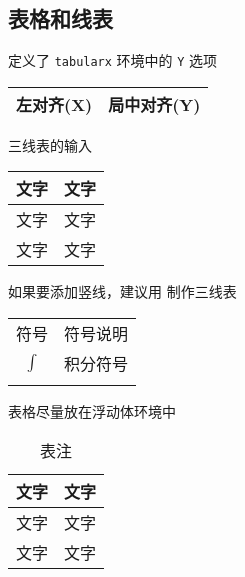 \documentclass{JXUSTmodeling}
\begin{document}
\subsection{表格和线表}
定义了 \texttt{tabularx} 环境中的 \texttt{Y} 选项
\begin{hexample}
\begin{tabularx}{\textwidth}{XY}
  \hline
  左对齐(X) & 局中对齐(Y)\\
  \hline
\end{tabularx}
\end{hexample}

三线表的输入
\begin{hexample}
\begin{tabularx}{\textwidth}{YY}
  \toprule
  文字 & 文字\\
  \midrule
  文字 & 文字\\
  文字 & 文字\\
  \bottomrule
\end{tabularx}
\end{hexample}
如果要添加竖线，建议用 \texttt{} 制作三线表
\begin{hexample}
\begin{tabularx}{\textwidth}{c@{\hspace{1pc}}|@{\hspace{1pc}}X}
  \Xhline{0.08em}
  符号 & \multicolumn{1}{c}{符号说明}\\
  \Xhline{0.05em}
  $\int$ & 积分符号\\
  \Xhline{0.08em}
\end{tabularx}
\end{hexample}
表格尽量放在浮动体环境中
\begin{floatexample}
\begin{table}[htbp]
  \centering
  \caption{表注}\label{tab:example}
  \begin{tabularx}{\textwidth}{YY}
    \toprule %
    文字 & 文字\\
    \midrule %
    文字 & 文字\\
    文字 & 文字\\
    \bottomrule %
  \end{tabularx}
\end{table}
\end{floatexample}
\end{document}
